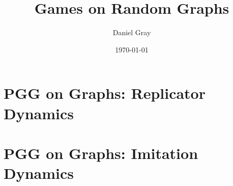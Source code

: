 \documentclass[12pt,twoside]{report}
\title{Games on Random Graphs}
\author{Daniel Gray}
\date{\today}
\begin{document}


%




\tableofcontents




%
%

\chapter{PGG on Graphs: Replicator Dynamics} 
\label{Chapter:Rep}

\chapter{PGG on Graphs: Imitation Dynamics} 
\label{Chapter:ID}


\label{CA}
%

%

\appendix
%

\printbibliography
\end{document}
